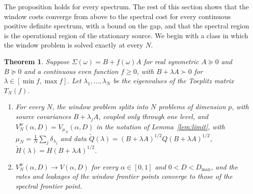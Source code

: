 \documentclass[11pt,onecolumn]{IEEEtran}
\newtheorem{theorem}{Theorem}
\newcommand{\tQ}{\tilde Q}
\newcommand{\tH}{\tilde H}
\begin{document}
The proposition holds for every spectrum. The rest of this section
shows that the window costs converge from above to the spectral cost for every
continuous positive definite spectrum, with a bound on the gap, and
that the spectral region is the operational region of the stationary
source. We begin with a class in which the window problem is solved
exactly at every $N$.

\begin{theorem}\label{thm:affine}
Suppose $\Sigma(\omega)=B+f(\omega)A$ for real symmetric $A\succeq0$ and
$B\succeq0$ and a continuous even function $f\ge0$, with
$B+\lambda A\succ0$ for $\lambda\in[\min f,\max f]$. Let
$\lambda_1,\dots,\lambda_N$ be the eigenvalues of the Toeplitz matrix
$T_N(f)$.
\begin{enumerate}
\item[(a)] For every $N$, the window problem splits into $N$ problems
of dimension $p$, with source covariances $B+\lambda_jA$, coupled only
through one level, and
$V^{\mathrm w}_N(\alpha,D)=V_{\mu_N}(\alpha,D)$ in the notation of
Lemma~\ref{lem:limit}, with $\mu_N=\tfrac1N\sum_j\delta_{\lambda_j}$ and
data $\tQ(\lambda)=(B+\lambda A)^{1/2}Q(B+\lambda A)^{1/2}$,
$\tH(\lambda)=H(B+\lambda A)^{1/2}$.
\item[(b)] $V^{\mathrm w}_N(\alpha,D)\to V(\alpha,D)$ for every
$\alpha\in[0,1]$ and $0<D<D_{\max}$, and the rates and leakages of the
window frontier points converge to those of the spectral frontier
point.
\end{enumerate}
\end{theorem}
\end{document}
